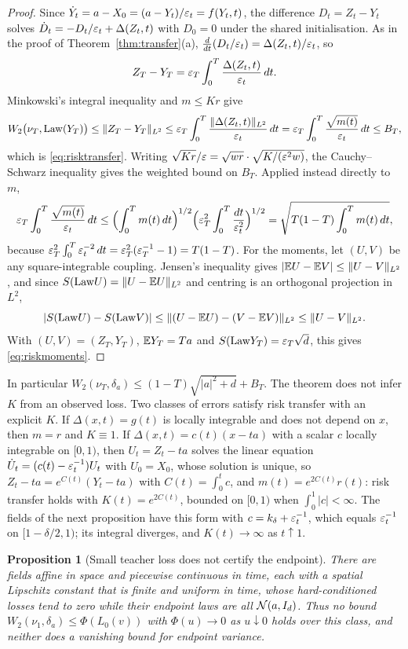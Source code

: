 \documentclass{article} %
\theoremstyle{plain}
\newtheorem{proposition}[theorem]{Proposition}
\theoremstyle{definition}
\theoremstyle{remark}
\begin{document}
\begin{proof}
Since $\dot Y_t=a-X_0=(a-Y_t)/\varepsilon_t=f(Y_t,t)$, the difference $D_t=Z_t-Y_t$ solves
$\dot D_t=-D_t/\varepsilon_t+\Delta(Z_t,t)$ with $D_0=0$ under the shared initialisation. As in the proof
of Theorem~\ref{thm:transfer}(a), $\frac{d}{dt}(D_t/\varepsilon_t)=\Delta(Z_t,t)/\varepsilon_t$, so
\[
Z_T-Y_T=\varepsilon_T\int_0^T\frac{\Delta(Z_t,t)}{\varepsilon_t}\,dt .
\]
Minkowski's integral inequality and $m\le Kr$ give
\[
W_2\bigl(\nu_T,\mathrm{Law}(Y_T)\bigr)\le\|Z_T-Y_T\|_{L^2}
\le\varepsilon_T\int_0^T\frac{\|\Delta(Z_t,t)\|_{L^2}}{\varepsilon_t}\,dt
=\varepsilon_T\int_0^T\frac{\sqrt{m(t)}}{\varepsilon_t}\,dt\le B_T,
\]
which is \eqref{eq:risktransfer}. Writing $\sqrt{K r}/\varepsilon=\sqrt{wr}\cdot\sqrt{K/(\varepsilon^2w)}$, the
Cauchy--Schwarz inequality gives the weighted bound on $B_T$. Applied instead directly to $m$,
\[
\varepsilon_T\int_0^T\frac{\sqrt{m(t)}}{\varepsilon_t}\,dt
\le\Bigl(\int_0^Tm(t)\,dt\Bigr)^{1/2}\Bigl(\varepsilon_T^2\int_0^T\frac{dt}{\varepsilon_t^2}\Bigr)^{1/2}
=\sqrt{T(1-T)\int_0^Tm(t)\,dt},
\]
because $\varepsilon_T^2\int_0^T\varepsilon_t^{-2}\,dt=\varepsilon_T^2(\varepsilon_T^{-1}-1)=T(1-T)$. For the moments, let
$(U,V)$ be any square-integrable coupling. Jensen's inequality gives
$|\mathbb{E} U-\mathbb{E} V|\le\|U-V\|_{L^2}$, and since $S(\mathrm{Law} U)=\|U-\mathbb{E} U\|_{L^2}$ and centring is an orthogonal
projection in $L^2$,
\[
|S(\mathrm{Law} U)-S(\mathrm{Law} V)|\le\|(U-\mathbb{E} U)-(V-\mathbb{E} V)\|_{L^2}\le\|U-V\|_{L^2}.
\]
With $(U,V)=(Z_T,Y_T)$, $\mathbb{E} Y_T=Ta$ and $S(\mathrm{Law} Y_T)=\varepsilon_T\sqrt d$, this gives
\eqref{eq:riskmoments}.
\end{proof}

In particular $W_2(\nu_T,\delta_a)\le(1-T)\sqrt{|a|^2+d}+B_T$. The theorem does not infer $K$
from an observed loss. Two classes of errors satisfy risk transfer with an explicit $K$. If
$\Delta(x,t)=g(t)$ is locally integrable and does not depend on $x$, then $m=r$ and $K\equiv1$.
If $\Delta(x,t)=c(t)(x-ta)$ with a scalar $c$ locally integrable on $[0,1)$, then $U_t=Z_t-ta$
solves the linear equation $\dot U_t=(c(t)-\varepsilon_t^{-1})U_t$ with $U_0=X_0$, whose solution is
unique, so $Z_t-ta=e^{C(t)}(Y_t-ta)$ with $C(t)=\int_0^tc$, and $m(t)=e^{2C(t)}r(t)$: risk
transfer holds with $K(t)=e^{2C(t)}$, bounded on $[0,1)$ when $\int_0^1|c|<\infty$. The fields of
the next proposition have this form with $c=k_\delta+\varepsilon_t^{-1}$, which equals $\varepsilon_t^{-1}$ on
$[1-\delta/2,1)$; its integral diverges, and $K(t)\to\infty$ as $t\uparrow1$.

\begin{proposition}[Small teacher loss does not certify the endpoint]
\label{prop:loss-no-certificate}
There are fields affine in space and piecewise continuous in time, each with a
spatial Lipschitz constant that is finite and uniform in time, whose hard-conditioned losses tend
to zero while their endpoint laws are all $\mathcal{N}(a,I_d)$. Thus no bound
$W_2(\nu_1,\delta_a)\le\Phi(L_0(v))$ with $\Phi(u)\to0$ as $u\downarrow0$
holds over this class, and neither does a vanishing bound for endpoint variance.
\end{proposition}
\end{document}

